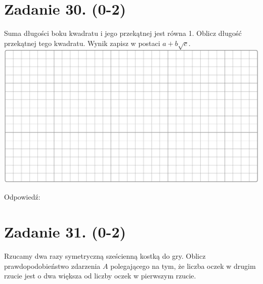 \documentclass[10pt]{article}
\begin{document}
\section*{Zadanie 30. (0-2)}
Suma długości boku kwadratu i jego przekątnej jest równa 1. Oblicz długość przekątnej tego kwadratu. Wynik zapisz w postaci \(a+b \sqrt{c}\).\\
\includegraphics[max width=\textwidth, center]{2024_11_21_e15da647cf0a41077ac3g-12}

Odpowiedź:

\section*{Zadanie 31. (0-2)}
Rzucamy dwa razy symetryczną sześcienną kostką do gry. Oblicz prawdopodobieństwo zdarzenia \(A\) polegającego na tym, że liczba oczek w drugim rzucie jest o dwa większa od liczby oczek w pierwszym rzucie.
\end{document}
